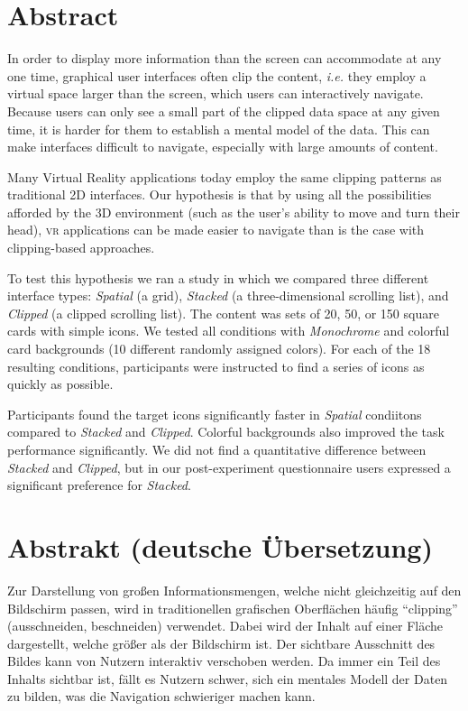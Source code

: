 \documentclass[nobib]{tufte-book} %
\newcommand{\hairsp}{\hspace{1pt}} %
\newcommand{\ie}{\textit{i.\hairsp{}e.}\xspace} %
\begin{document}
\chapter{Abstract}
In order to display more information than the screen can accommodate at any one time, graphical user interfaces often clip the content, \ie they employ a virtual space larger than the screen, which users can interactively navigate. Because users can only see a small part of the clipped data space at any given time, it is harder for them to establish a mental model of the data. This can make interfaces difficult to navigate, especially with large amounts of content.

Many Virtual Reality applications today employ the same clipping patterns as traditional 2D interfaces. Our hypothesis is that by using all the possibilities afforded by the 3D environment (such as the user's ability to move and turn their head), \textsc{vr} applications can be made easier to navigate than is the case with clipping-based approaches.

To test this hypothesis we ran a study in which we compared three different interface types: \emph{Spatial} (a grid), \emph{Stacked} (a three-dimensional scrolling list), and \emph{Clipped} (a clipped scrolling list). The content was sets of 20, 50, or 150 square cards with simple icons. We tested all conditions with \emph{Monochrome} and colorful card backgrounds (10 different randomly assigned colors). For each of the 18 resulting conditions, participants were instructed to find a series of icons as quickly as possible.

Participants found the target icons significantly faster in \emph{Spatial} condiitons compared to \emph{Stacked} and \emph{Clipped}. Colorful backgrounds also improved the task performance significantly. We did not find a quantitative difference between \emph{Stacked} and \emph{Clipped}, but in our post-experiment questionnaire users expressed a significant preference for \emph{Stacked}.

\chapter{Abstrakt (deutsche {\"U}bersetzung)}
Zur Darstellung von gro{\ss}en Informationsmengen, welche nicht gleichzeitig auf den Bildschirm passen, wird in traditionellen grafischen Oberfl{\"a}chen h{\"a}ufig ``clipping'' (ausschneiden, beschneiden) verwendet. Dabei wird der Inhalt auf einer Fl{\"a}che dargestellt, welche gr{\"o}{\ss}er als der Bildschirm ist. Der sichtbare Ausschnitt des Bildes kann von Nutzern interaktiv verschoben werden. Da immer ein Teil des Inhalts sichtbar ist, f{\"a}llt es Nutzern schwer, sich ein mentales Modell der Daten zu bilden, was die Navigation schwieriger machen kann.
\end{document}
